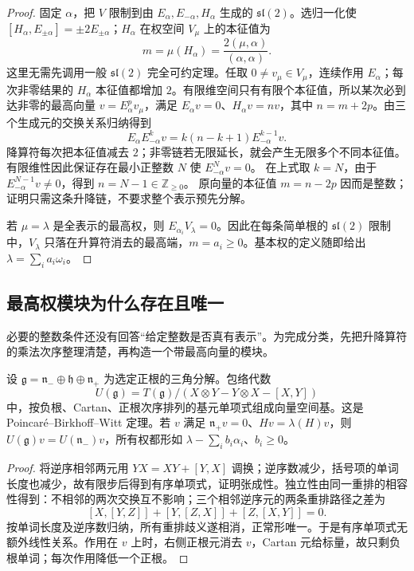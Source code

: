 \begin{proof}
固定 $\alpha$，把 $V$ 限制到由 $E_\alpha,E_{-\alpha},H_\alpha$ 生成的 $\mathfrak{sl}(2)$。选归一化使 $[H_\alpha,E_{\pm\alpha}]=\pm2E_{\pm\alpha}$；$H_\alpha$ 在权空间 $V_\mu$ 上的本征值为
\[
m=\mu(H_\alpha)=\frac{2(\mu,\alpha)}{(\alpha,\alpha)}.
\]
这里无需先调用一般 $\mathfrak{sl}(2)$ 完全可约定理。任取 $0\ne v_\mu\in V_\mu$，连续作用 $E_\alpha$；每次非零结果的 $H_\alpha$ 本征值都增加 $2$。有限维空间只有有限个本征值，所以某次必到达非零的最高向量 $v=E_\alpha^p v_\mu$，满足 $E_\alpha v=0$、$H_\alpha v=nv$，其中 $n=m+2p$。由三个生成元的交换关系归纳得到
\[
E_\alpha E_{-\alpha}^{k}v
=k(n-k+1)E_{-\alpha}^{k-1}v.
\]
降算符每次把本征值减去 $2$；非零链若无限延长，就会产生无限多个不同本征值。
有限维性因此保证存在最小正整数 $N$ 使 $E_{-\alpha}^{N}v=0$。
在上式取 $k=N$，由于 $E_{-\alpha}^{N-1}v\ne0$，得到 $n=N-1\in\mathbb Z_{\ge0}$。
原向量的本征值 $m=n-2p$ 因而是整数；证明只需这条升降链，不要求整个表示预先分解。

若 $\mu=\lambda$ 是全表示的最高权，则 $E_{\alpha_i}V_\lambda=0$。因此在每条简单根的 $\mathfrak{sl}(2)$ 限制中，$V_\lambda$ 只落在升算符消去的最高端，$m=a_i\ge0$。基本权的定义随即给出 $\lambda=\sum_i a_i\omega_i$。
\end{proof}

\subsection{最高权模块为什么存在且唯一}

必要的整数条件还没有回答“给定整数是否真有表示”。为完成分类，先把升降算符的乘法次序整理清楚，再构造一个带最高向量的模块。

\begin{lemma}[有序单项式与最高权生成]
设 $\mathfrak g=\mathfrak n_-\oplus\mathfrak h\oplus\mathfrak n_+$ 为选定正根的三角分解。包络代数
\[
 U(\mathfrak g)=T(\mathfrak g)/(X\otimes Y-Y\otimes X-[X,Y])
\]
中，按负根、Cartan、正根次序排列的基元单项式组成向量空间基。这是 Poincar\'e--Birkhoff--Witt 定理。若 $v$ 满足 $\mathfrak n_+v=0$、$Hv=\lambda(H)v$，则 $U(\mathfrak g)v=U(\mathfrak n_-)v$，所有权都形如 $\lambda-\sum_i b_i\alpha_i$、$b_i\ge0$。
\end{lemma}
\begin{proof}
将逆序相邻两元用 $YX=XY+[Y,X]$ 调换；逆序数减少，括号项的单词长度也减少，故有限步后得到有序单项式，证明张成性。独立性由同一重排的相容性得到：不相邻的两次交换互不影响；三个相邻逆序元的两条重排路径之差为
\[
 [X,[Y,Z]]+[Y,[Z,X]]+[Z,[X,Y]]=0.
\]
按单词长度及逆序数归纳，所有重排歧义遂相消，正常形唯一。于是有序单项式无额外线性关系。作用在 $v$ 上时，右侧正根元消去 $v$，Cartan 元给标量，故只剩负根单词；每次作用降低一个正根。
\end{proof}

